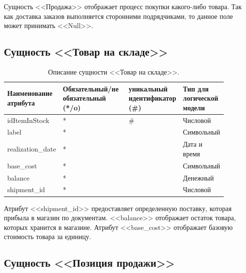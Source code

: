 \documentclass[14pt]{extreport}
\begin{document}
        Сущность <<Продажа>> отображает процесс покупки какого-либо товара. Так как доставка заказов выполняется сторонними подрядчиками, то данное поле может принимать <<Null>>.

    \subsection*{Сущность <<Товар на складе>>}

        \begin{table}[H]
            \caption{Описание сущности <<Товар на складе>>.}
            
            \begin{tabular}{|p{0.2\linewidth}|p{0.3\linewidth}|p{0.2\linewidth}|p{0.2\linewidth}|}
                \hline
                Наименование атрибута & Обязательный/не обязательный (*/o) & уникальный идентификатор (\#) & Тип для логической модели
                \\ \hline
                idItemInStock & * & \# & Числовой \\ \hline
                label & * & & Символьный\\ \hline
                realization\_date & * & & Дата и время \\ \hline
                base\_cost & * &  & Символьный  \\ \hline
                balance & * & & Денежный \\ \hline
                shipment\_id & * & & Числовой \\ \hline 
            \end{tabular}
        \end{table}

        Атрибут <<shipment\_id>> предоставляет определенную поставку, которая прибыла в магазин по документам.%
        <<balance>> отображает остаток товара, которых хранится в магазине. Атрибут <<base\_cost>> отображает базовую стоимость товара за единицу. 
    
        \subsection*{Сущность <<Позиция продажи>>}
\end{document}
